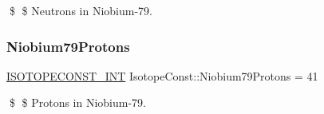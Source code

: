 \$ \$ Neutrons in Niobium-\/79. \mbox{\label{group___isotope_const-_niobium-_nb79_ga92a7814b0276540db03d3b99fe50e062}} 
\subsubsection{\texorpdfstring{Niobium79\+Protons}{Niobium79Protons}}
{\footnotesize\ttfamily \mbox{\hyperlink{group___isotope_const-_macros_ga5f18360b3e99483a35c32d789e62621c}{I\+S\+O\+T\+O\+P\+E\+C\+O\+N\+S\+T\+\_\+\+I\+NT}} Isotope\+Const\+::\+Niobium79\+Protons = 41}

\$ \$ Protons in Niobium-\/79. 